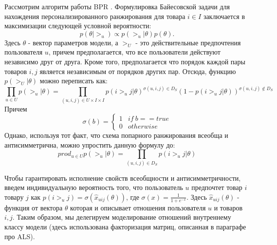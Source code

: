\documentclass[14pt]{mmcs_article}
\begin{document}
Рассмотрим алгоритм работы BPR \cite{BPR:1205}.
Формулировка Байесовской задачи для нахождения персонализированного ранжирования для товара $  i \in I$ заключается в максимизации следующей условной вероятности:
\begin{equation}
	p(\theta | >_u) \propto p(>_u | \theta)p(\theta).
\end{equation} 
Здесь $\theta$ - вектор параметров модели, а $ >_U $ - это действительные предпочтения пользователя $ u $, причем предполагается, что все пользователи действуют независимо друг от друга. Кроме того, предполагается что порядок каждой пары товаров $ i,j $ является независимым от порядков других пар. Отсюда, функцию $ p(>_U | \theta) $ можно 
переписать как:
\begin{equation}
	\prod_{u \in U} p(>_u | \theta) = 	\prod_{(u,i,j) \in U \times I \times I} p(i >_u j | \theta )^{\sigma(u,i,j) \in D_S} (1 - p(i >_u j | \theta ))^{\sigma(u,i,j) \notin D_S}
\end{equation}
Причем
\begin{equation}
	\sigma(b) = \begin{cases}
		1 & if \ b == true \\
		0 & otherwise
	\end{cases}
\end{equation}
Однако, используя тот факт, что схема попарного ранжирования всеобща и антисимметрична, можно упростить данную формулу до:
\begin{equation}
	prod_{u \in U} p(>_u | \theta) = \prod_{(u,i,j) \in D_S} p(i >_u j | \theta)
\end{equation}

Чтобы гарантировать исполнение свойств всеобщности и антисимметричности, введем индивидуальную вероятность того, что пользователь $ u $ предпочтет товар $ i $ товару $ j $ как $p(i >_u j) = \sigma(\hat{x}_{uij}(\theta))$, где $\sigma(x) = \frac{1}{1+e^{-x}}$. Здесь $ \hat{x}_{uij}(\theta) $ - функция от вектора $\theta$ которая и описывает отношения пользователя $u$ и товаров $ i,j $. Таким образом, мы делегируем моделирование отношений внутреннему классу модели (здесь использована факторизация матриц, описанная в параграфе про ALS).  
\end{document}
